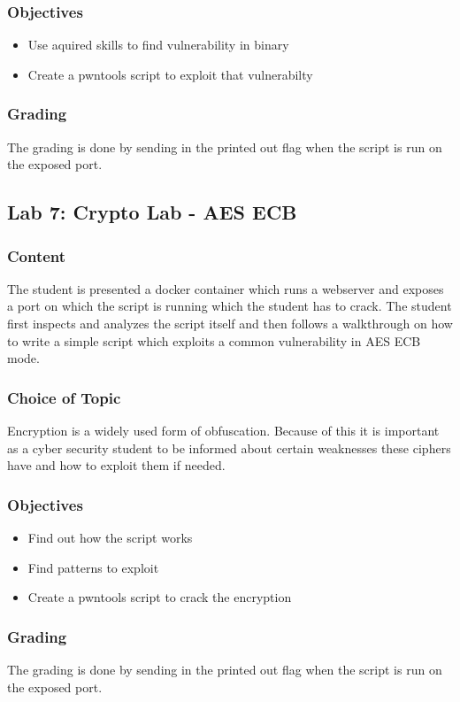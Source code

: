 \subsubsection*{Objectives}
\begin{itemize}
    \item Use aquired skills to find vulnerability in binary
    \item Create a pwntools script to exploit that vulnerabilty
\end{itemize}
\subsubsection*{Grading}
The grading is done by sending in the printed out flag when the script is run on the exposed port.


\subsection{Lab 7: Crypto Lab - AES ECB}
\subsubsection*{Content}
The student is presented a docker container which runs a webserver and exposes a port on which the script is running which the student has to crack. The student first inspects and analyzes the script itself and then follows a walkthrough on how to write a simple script which exploits a common vulnerability in AES ECB mode. 
\subsubsection*{Choice of Topic}
Encryption is a widely used form of obfuscation. Because of this it is important as a cyber security student to be informed about certain weaknesses these ciphers have and how to exploit them if needed. 
\subsubsection*{Objectives}
\begin{itemize}
    \item Find out how the script works
    \item Find patterns to exploit
    \item Create a pwntools script to crack the encryption
\end{itemize}
\subsubsection*{Grading}
The grading is done by sending in the printed out flag when the script is run on the exposed port.


